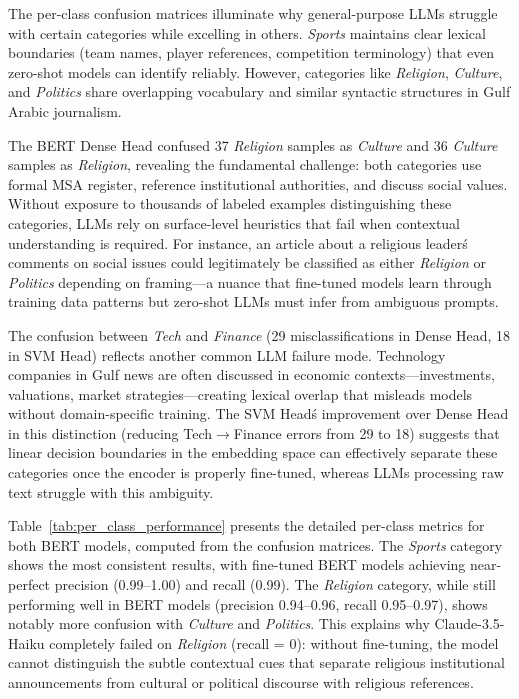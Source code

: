 \documentclass[sn-mathphys-num]{sn-jnl}
\begin{document}
The per-class confusion matrices illuminate why general-purpose LLMs struggle with certain categories while excelling in others. \textit{Sports} maintains clear lexical boundaries (team names, player references, competition terminology) that even zero-shot models can identify reliably. However, categories like \textit{Religion}, \textit{Culture}, and \textit{Politics} share overlapping vocabulary and similar syntactic structures in Gulf Arabic journalism.

The BERT Dense Head confused 37 \textit{Religion} samples as \textit{Culture} and 36 \textit{Culture} samples as \textit{Religion}, revealing the fundamental challenge: both categories use formal MSA register, reference institutional authorities, and discuss social values. Without exposure to thousands of labeled examples distinguishing these categories, LLMs rely on surface-level heuristics that fail when contextual understanding is required. For instance, an article about a religious leader\'s comments on social issues could legitimately be classified as either \textit{Religion} or \textit{Politics} depending on framing---a nuance that fine-tuned models learn through training data patterns but zero-shot LLMs must infer from ambiguous prompts.

The confusion between \textit{Tech} and \textit{Finance} (29 misclassifications in Dense Head, 18 in SVM Head) reflects another common LLM failure mode. Technology companies in Gulf news are often discussed in economic contexts---investments, valuations, market strategies---creating lexical overlap that misleads models without domain-specific training. The SVM Head\'s improvement over Dense Head in this distinction (reducing Tech$\rightarrow$Finance errors from 29 to 18) suggests that linear decision boundaries in the embedding space can effectively separate these categories once the encoder is properly fine-tuned, whereas LLMs processing raw text struggle with this ambiguity.

Table~\ref{tab:per_class_performance} presents the detailed per-class metrics for both BERT models, computed from the confusion matrices. The \textit{Sports} category shows the most consistent results, with fine-tuned BERT models achieving near-perfect precision (0.99--1.00) and recall (0.99). The \textit{Religion} category, while still performing well in BERT models (precision 0.94--0.96, recall 0.95--0.97), shows notably more confusion with \textit{Culture} and \textit{Politics}. This explains why Claude-3.5-Haiku completely failed on \textit{Religion} (recall = 0): without fine-tuning, the model cannot distinguish the subtle contextual cues that separate religious institutional announcements from cultural or political discourse with religious references.
\end{document}

